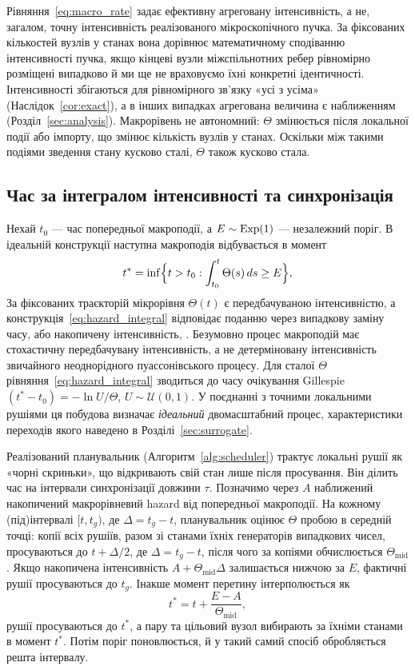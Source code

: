 Рівняння~\eqref{eq:macro_rate} задає ефективну агреговану інтенсивність, а не, загалом, точну інтенсивність реалізованого мікроскопічного пучка. За фіксованих кількостей вузлів у станах вона дорівнює математичному сподіванню інтенсивності пучка, якщо кінцеві вузли міжспільнотних ребер рівномірно розміщені випадково й ми ще не враховуємо їхні конкретні ідентичності. Інтенсивності збігаються для рівномірного зв'язку «усі з усіма» (Наслідок~\ref{cor:exact}), а в інших випадках агрегована величина є наближенням (Розділ~\ref{sec:analysis}). Макрорівень не автономний: $\Theta$ змінюється після локальної події або імпорту, що змінює кількість вузлів у станах. Оскільки між такими подіями зведення стану кусково сталі, $\Theta$ також кусково стала.

\subsection{Час за інтегралом інтенсивності та синхронізація}
\label{sec:timing}

Нехай $t_0$ --- час попередньої макроподії, а $E\sim\mathrm{Exp}(1)$ --- незалежний поріг. В ідеальній конструкції наступна макроподія відбувається в момент
\begin{equation}
\label{eq:hazard_integral}
t^\ast=\inf\Bigl\{t>t_0:\int_{t_0}^{t}\Theta(s)\,ds\ge E\Bigr\},
\end{equation}
За фіксованих траєкторій мікрорівня $\Theta(t)$ є передбачуваною інтенсивністю, а конструкція~\eqref{eq:hazard_integral} відповідає поданню через випадкову заміну часу, або накопичену інтенсивність, \citep{ethier1986,anderson2007}. Безумовно процес макроподій має стохастичну передбачувану інтенсивність, а не детерміновану інтенсивність звичайного неоднорідного пуассонівського процесу. Для сталої $\Theta$ рівняння~\eqref{eq:hazard_integral} зводиться до часу очікування Gillespie $(t^\ast-t_0)=-\ln U/\Theta$, $U\sim\mathcal{U}(0,1)$. У поєднанні з точними локальними рушіями ця побудова визначає \emph{ідеальний} двомасштабний процес, характеристики переходів якого наведено в Розділі~\ref{sec:surrogate}.

Реалізований планувальник (Алгоритм~\ref{alg:scheduler}) трактує локальні рушії як «чорні скриньки», що відкривають свій стан лише після просування. Він ділить час на інтервали синхронізації довжини $\tau$. Позначимо через $A$ наближений накопичений макрорівневий hazard від попередньої макроподії. На кожному (під)інтервалі $[t,t_g)$, де $\Delta=t_g-t$, планувальник оцінює $\Theta$ пробою в середній точці: копії всіх рушіїв, разом зі станами їхніх генераторів випадкових чисел, просуваються до $t+\Delta/2$, де $\Delta=t_g-t$, після чого за копіями обчислюється $\Theta_{\mathrm{mid}}$. Якщо накопичена інтенсивність $A+\Theta_{\mathrm{mid}}\Delta$ залишається нижчою за $E$, фактичні рушії просуваються до $t_g$. Інакше момент перетину інтерполюється як
\begin{equation}
\label{eq:interpolation}
t^\ast=t+\frac{E-A}{\Theta_{\mathrm{mid}}},
\end{equation}
рушії просуваються до $t^\ast$, а пару та цільовий вузол вибирають за їхніми станами в момент $t^\ast$. Потім поріг поновлюється, й у такий самий спосіб обробляється решта інтервалу.

